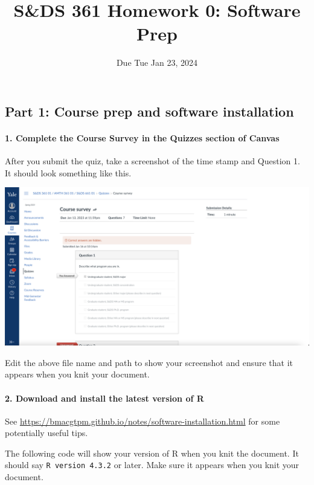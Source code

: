 \documentclass[
]{article}
\title{S\&DS 361 Homework 0: Software Prep}
\author{}
\date{\vspace{-2.5em}Due Tue Jan 23, 2024}
\begin{document}
\maketitle

\hypertarget{part-1-course-prep-and-software-installation}{%
\subsection{Part 1: Course prep and software
installation}\label{part-1-course-prep-and-software-installation}}

\hypertarget{complete-the-course-survey-in-the-quizzes-section-of-canvas}{%
\paragraph{1. Complete the Course Survey in the Quizzes section of
Canvas}\label{complete-the-course-survey-in-the-quizzes-section-of-canvas}}

After you submit the quiz, take a screenshot of the time stamp and
Question 1. It should look something like this.

\includegraphics{img/snip of Course Survey.png}

Edit the above file name and path to show your screenshot and ensure
that it appears when you knit your document.

\hypertarget{download-and-install-the-latest-version-of-r}{%
\paragraph{2. Download and install the latest version of
R}\label{download-and-install-the-latest-version-of-r}}

See \url{https://bmacgtpm.github.io/notes/software-installation.html}
for some potentially useful tips.

The following code will show your version of R when you knit the
document. It should say \texttt{R\ version\ 4.3.2} or later. Make sure
it appears when you knit your document.
\end{document}
